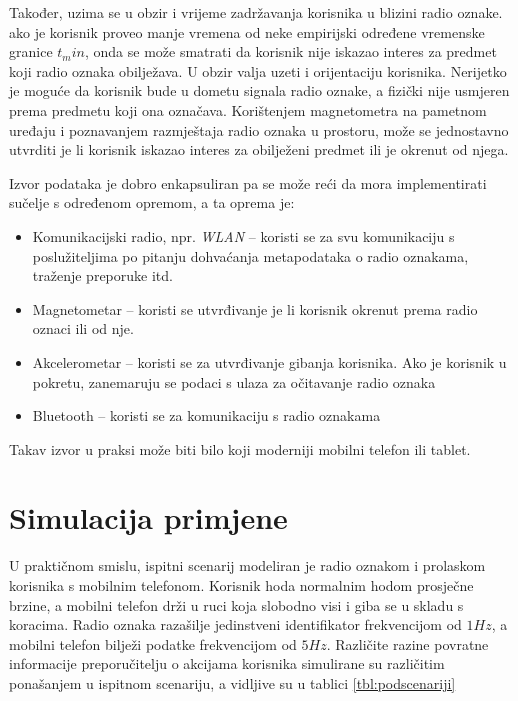 \documentclass[times, utf8, diplomski, numeric]{fer}
\begin{document}
Također, uzima se u obzir i vrijeme zadržavanja korisnika u blizini radio
oznake. ako je korisnik proveo manje vremena od neke empirijski određene
vremenske granice $t_min$, onda se može smatrati da korisnik nije iskazao
interes za predmet koji radio oznaka obilježava.
U obzir valja uzeti i orijentaciju korisnika. Nerijetko je moguće da korisnik
bude u dometu signala radio oznake, a fizički nije usmjeren prema predmetu koji
ona označava. Korištenjem magnetometra na pametnom uređaju i poznavanjem
razmještaja radio oznaka u prostoru, može se jednostavno utvrditi je li korisnik
iskazao interes za obilježeni predmet ili je okrenut od njega.

Izvor podataka je dobro enkapsuliran pa se može reći da mora implementirati
sučelje s određenom opremom, a ta oprema je:
\begin{itemize}
  \item Komunikacijski radio, npr. \emph{WLAN}  -- koristi
  se za svu komunikaciju s poslužiteljima po pitanju dohvaćanja metapodataka o
  radio oznakama, traženje preporuke itd.
  \item Magnetometar -- koristi se utvrđivanje je li korisnik okrenut prema
  radio oznaci ili od nje. %
  \item Akcelerometar -- koristi se za utvrđivanje gibanja korisnika. Ako je
  korisnik u pokretu, zanemaruju se podaci s ulaza za očitavanje radio oznaka
  \item Bluetooth -- koristi se za komunikaciju s radio oznakama
\end{itemize}

Takav izvor u praksi može biti bilo koji moderniji mobilni telefon ili tablet.

\section{Simulacija primjene}
U praktičnom smislu, ispitni scenarij modeliran je radio oznakom i prolaskom
korisnika s mobilnim telefonom. Korisnik hoda normalnim hodom prosječne brzine,
a mobilni telefon drži u ruci koja slobodno visi i giba se u skladu s koracima.
Radio oznaka razašilje jedinstveni identifikator frekvencijom od $1 Hz$, a
mobilni telefon bilježi podatke frekvencijom od $5 Hz$. Različite razine
povratne informacije preporučitelju o akcijama korisnika simulirane su
različitim ponašanjem u ispitnom scenariju, a vidljive su u tablici
\ref{tbl:podscenariji}
\end{document}

